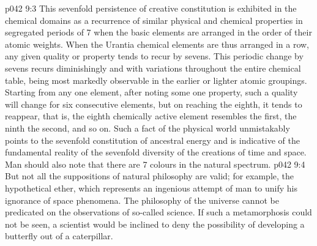\vs p042 9:3 This sevenfold persistence of creative constitution is exhibited in the chemical domains as a recurrence of similar physical and chemical properties in segregated periods of 7 when the basic elements are arranged in the order of their atomic weights. When the Urantia chemical elements are thus arranged in a row, any given quality or property tends to recur by sevens. This periodic change by sevens recurs diminishingly and with variations throughout the entire chemical table, being most markedly observable in the earlier or lighter atomic groupings. Starting from any one element, after noting some one property, such a quality will change for six consecutive elements, but on reaching the eighth, it tends to reappear, that is, the eighth chemically active element resembles the first, the ninth the second, and so on. Such a fact of the physical world unmistakably points to the sevenfold constitution of ancestral energy and is indicative of the fundamental reality of the sevenfold diversity of the creations of time and space. Man should also note that there are 7 colours in the natural spectrum.
\vs p042 9:4 But not all the suppositions of natural philosophy are valid; for example, the hypothetical ether, which represents an ingenious attempt of man to unify his ignorance of space phenomena. The philosophy of the universe cannot be predicated on the observations of so\hyp{}called science. If such a metamorphosis could not be seen, a scientist would be inclined to deny the possibility of developing a butterfly out of a caterpillar.
